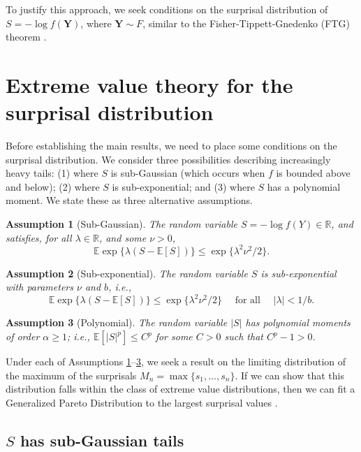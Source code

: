 \documentclass[a4paper,11pt]{article}
\newcommand{\E}{\mathbb{E}}
\newtheorem{assumption}{Assumption}
\begin{document}
To justify this approach, we seek conditions on the surprisal distribution of $S = -\log f(\bm{Y})$, where $\bm{Y}\sim F$, similar to the Fisher-Tippett-Gnedenko (FTG) theorem \citep{coles2001introduction}.


\section{Extreme value theory for the surprisal distribution}

Before establishing the main results, we need to place some conditions on the surprisal distribution. We consider three possibilities describing increasingly heavy tails: (1) where $S$ is sub-Gaussian (which occurs when $f$ is bounded above and below); (2) where $S$ is sub-exponential; and (3) where $S$ has a polynomial moment. We state these as three alternative assumptions.

\begin{assumption}[Sub-Gaussian]\label{ass:bounded}
	The random variable $S =-\log f(Y)\in\mathbb{R}$, and satisfies, for all $\lambda\in\mathbb{R}$, and some $\nu>0$,
	$$
		\E \exp\{\lambda (S-\E[S])\}\le \exp\{\lambda^2 \nu^2/2\}.
	$$
\end{assumption}

\begin{assumption}[Sub-exponential]\label{ass:subbounded}The random variable $S$ is sub-exponential with parameters $\nu$ and $b$, i.e.,
	$$
		\E \exp\{\lambda(S-\E[S])\} \leq \exp\{\lambda^2\nu^2/ 2\} \quad\text{ for all } \quad |\lambda|< 1/b.
	$$
\end{assumption}

\begin{assumption}[Polynomial]\label{ass:polybounded}
	The random variable $|S|$ has polynomial moments of order $\alpha\ge 1$; i.e.,
	$\mathbb{E}[|S|^p] \le C^p$ for some $C>0$ such that $C^p-1>0$.
\end{assumption}

Under each of Assumptions \ref{ass:bounded}--\ref{ass:polybounded}, we seek a result on the limiting distribution of the maximum of the surprisals $M_n = \max\{s_1,\dots,s_n\}$. If we can show that this distribution falls within the class of extreme value distributions, then we can fit a Generalized Pareto Distribution to the largest surprisal values \citep{coles2001introduction}.

\subsection{$S$ has sub-Gaussian tails}
\end{document}
